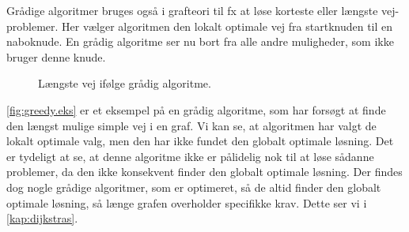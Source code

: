 Grådige algoritmer bruges også i grafteori til fx at løse korteste eller længste vej-problemer. Her vælger algoritmen den lokalt optimale vej fra startknuden til en naboknude. En grådig algoritme ser nu bort fra alle andre muligheder, som ikke bruger denne knude.

\begin{figure}[H]
\centering
	\caption{Længste vej ifølge grådig algoritme.}
	\label{fig:greedy.eks}
\end{figure}

\autoref{fig:greedy.eks} er et eksempel på en grådig algoritme, som har forsøgt at finde den længst mulige simple vej i en graf. Vi kan se, at algoritmen har valgt de lokalt optimale valg, men den har ikke fundet den globalt optimale løsning. Det er tydeligt at se, at denne algoritme ikke er pålidelig nok til at løse sådanne problemer, da den ikke konsekvent finder den globalt optimale løsning. Der findes dog nogle grådige algoritmer, som er optimeret, så de altid finder den globalt optimale løsning, så længe grafen overholder specifikke krav. Dette ser vi i \autoref{kap:dijkstras}.

